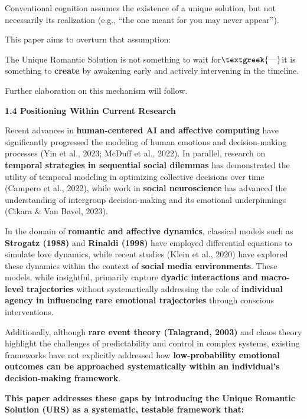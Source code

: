 \documentclass[a4paper]{article}
\begin{document}
Conventional cognition assumes the existence of a unique solution, but not necessarily its realization (e.g., “the one
meant for you may never appear”).

This paper aims to overturn that assumption:

The Unique Romantic Solution is not something to wait for$\text{\textgreek{—}}$it is something to \textbf{create} by
awakening early and actively intervening in the timeline.

Further elaboration on this mechanism will follow.

\textbf{1.4 Positioning Within Current Research}

Recent advances in \textbf{human-centered AI and affective computing} have significantly progressed the modeling of
human emotions and decision-making processes (Yin et al., 2023; McDuff et al., 2022). In parallel, research on
\textbf{temporal strategies in sequential social dilemmas} has demonstrated the utility of temporal modeling in
optimizing collective decisions over time (Campero et al., 2022), while work in \textbf{social neuroscience} has
advanced the understanding of intergroup decision-making and its emotional underpinnings (Cikara \& Van Bavel, 2023).

In the domain of \textbf{romantic and affective dynamics}, classical models such as \textbf{Strogatz (1988)} and
\textbf{Rinaldi (1998)} have employed differential equations to simulate love dynamics, while recent studies (Klein et
al., 2020) have explored these dynamics within the context of \textbf{social media environments}. These models, while
insightful, primarily capture \textbf{dyadic interactions and macro-level trajectories} without systematically
addressing the role of \textbf{individual agency in influencing rare emotional trajectories} through conscious
interventions.

Additionally, although \textbf{rare event theory (Talagrand, 2003)} and chaos theory highlight the challenges of
predictability and control in complex systems, existing frameworks have not explicitly addressed how
\textbf{low-probability emotional outcomes can be approached systematically within an individual's decision-making
framework}.

\textbf{This paper addresses these gaps by introducing the Unique Romantic Solution (URS) as a systematic, testable
framework that:}
\end{document}
